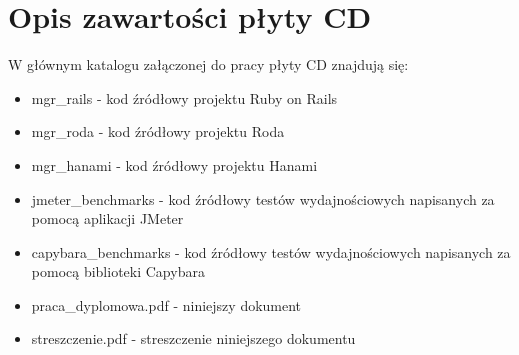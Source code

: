 \documentclass[archivemode]{mgr}
\begin{document}
\appendix

\chapter{Opis zawartości płyty CD}
W głównym katalogu załączonej do pracy płyty CD znajdują się:
\begin{itemize}
  \item mgr\_rails - kod źródłowy projektu Ruby on Rails
  \item mgr\_roda - kod źródłowy projektu Roda
  \item mgr\_hanami - kod źródłowy projektu Hanami
  \item jmeter\_benchmarks - kod źródłowy testów wydajnościowych napisanych za pomocą aplikacji JMeter
  \item capybara\_benchmarks - kod źródłowy testów wydajnościowych napisanych za pomocą biblioteki Capybara
  \item praca\_dyplomowa.pdf - niniejszy dokument
  \item streszczenie.pdf - streszczenie niniejszego dokumentu
\end{itemize}
\end{document}
